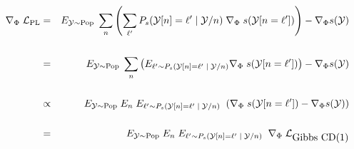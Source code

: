 {

{\huge
\begin{eqnarray*}
\nabla_\Phi\;{\cal L}_{\mathrm{PL}} & = & E_{{\cal Y} \sim \mathrm{Pop}}\;\sum_n \left(\sum_{\ell'} P_s({\cal Y}[n]=\ell'\;|\;{\cal Y}/n)\; \nabla_\Phi\;s({\cal Y}[n=\ell'])\right) - \nabla_\Phi s({\cal Y}) \\
\\
& = & E_{{\cal Y} \sim \mathrm{Pop}}\;\sum_n \left(E_{\ell' \sim P_s({\cal Y}[n]=\ell'\;|\;{\cal Y}/n)} \nabla_\Phi\;s({\cal Y}[n=\ell'])\right) - \nabla_\Phi s({\cal Y}) \\
\\
& \propto & E_{{\cal Y} \sim \mathrm{Pop}}\;E_n\;  E_{\ell' \sim P_s({\cal Y}[n]=\ell'\;|\;{\cal Y}/n)}\;\; (\nabla_\Phi\;s({\cal Y}[n=\ell']) - \nabla_\Phi s({\cal Y})) \\
\\
& = & E_{{\cal Y} \sim \mathrm{Pop}}\;E_n\; E_{\ell' \sim P_s({\cal Y}[n]=\ell'\;|\;{\cal Y}/n)}\;\; \nabla_\Phi\;{\cal L}_{\mbox{Gibbs CD(1)}}
\end{eqnarray*}
}

}

